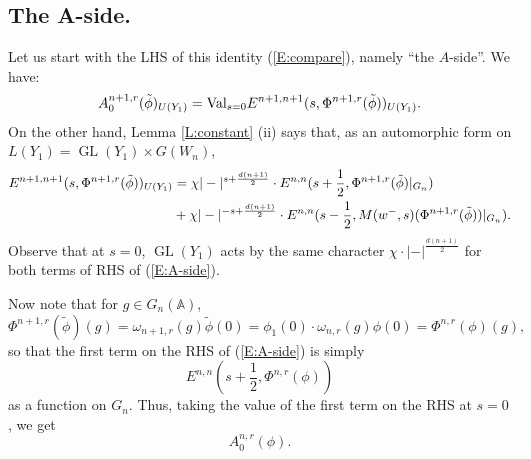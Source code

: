 \documentclass[10pt]{amsart}
\theoremstyle{plain}
\numberwithin{equation}{section}
\begin{document}
  
\subsection{\bf The A-side.}  Let us start with  the LHS of this
identity (\ref{E:compare}), namely ``the $A$-side''. We have:
  \[  A^{n+1,r}_0(\tilde{\phi})_{U(Y_1)} = {\rm Val}_{s=0}
  E^{n+1,n+1}(s, \Phi^{n+1,r}(\tilde{\phi}))_{U(Y_1)}. \]
 On the other hand, Lemma \ref{L:constant} (ii) says that, as an
 automorphic form on $L(Y_1) = {\operatorname{GL}}(Y_1) \times G(W_n)$, 
\begin{align} \label{E:A-side}
E^{n+1,n+1}(s,\Phi^{n+1,r}(\tilde{\phi}))_{U(Y_1)}
&=   \chi |-|^{s + \frac{d(n+1)}{2}}  \cdot E^{n,n}(s+\frac{1}{2}, \Phi^{n+1,r}(\tilde{\phi})|_{G_n})\\
 &+\chi  |-|^{-s + \frac{d(n+1)}{2}} \cdot  E^{n,n}(s - \frac{1}{2},
   M(w^-, s)(\Phi^{n+1,r}(\tilde{\phi}))|_{G_n}).\notag
\end{align}
 Observe that at $s=0$, ${\operatorname{GL}}(Y_1)$ acts by the same character $\chi
 \cdot | -|^{\frac{d(n+1)}{2}}$ for both terms of RHS of
 (\ref{E:A-side}).
 \vskip 5pt
 
 Now note that for $g \in G_n({\mathbb{A}})$,
 \[  \Phi^{n+1,r}(\tilde{\phi})(g) =  \omega_{n+1,r}(g) \tilde{\phi}(0)
 = \phi_1(0) \cdot \omega_{n,r}(g) \phi (0)
 = \Phi^{n,r}(\phi)(g), \]
 so that  the first term on the RHS of (\ref{E:A-side}) is simply 
 \[   E^{n,n}(s+\frac{1}{2}, \Phi^{n,r}(\phi))   \]
as a function on $G_n$. Thus, taking the value of the first term on
the RHS at $s = 0$, we get
 \begin{equation}\label{E:A-side1}
 A^{n,r}_0( \phi).
\end{equation}
\end{document}
